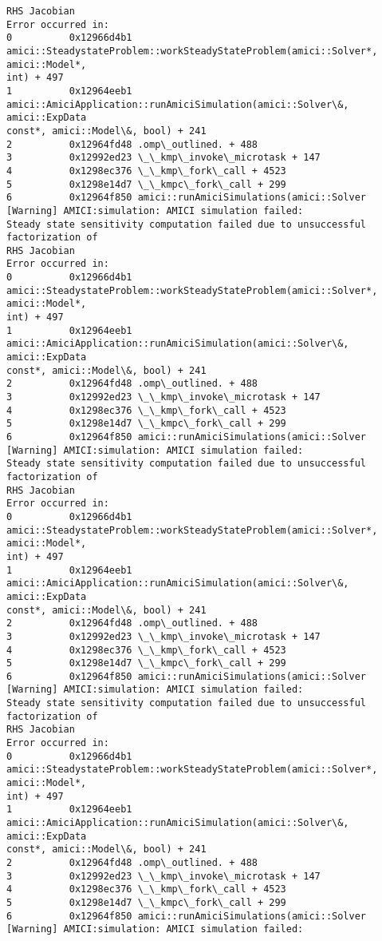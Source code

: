 \documentclass[11pt]{article}
\begin{document}
\begin{Verbatim}[commandchars=\\\{\}]
RHS Jacobian
Error occurred in:
0          0x12966d4b1
amici::SteadystateProblem::workSteadyStateProblem(amici::Solver*, amici::Model*,
int) + 497
1          0x12964eeb1
amici::AmiciApplication::runAmiciSimulation(amici::Solver\&, amici::ExpData
const*, amici::Model\&, bool) + 241
2          0x12964fd48 .omp\_outlined. + 488
3          0x12992ed23 \_\_kmp\_invoke\_microtask + 147
4          0x1298ec376 \_\_kmp\_fork\_call + 4523
5          0x1298e14d7 \_\_kmpc\_fork\_call + 299
6          0x12964f850 amici::runAmiciSimulations(amici::Solver
[Warning] AMICI:simulation: AMICI simulation failed:
Steady state sensitivity computation failed due to unsuccessful factorization of
RHS Jacobian
Error occurred in:
0          0x12966d4b1
amici::SteadystateProblem::workSteadyStateProblem(amici::Solver*, amici::Model*,
int) + 497
1          0x12964eeb1
amici::AmiciApplication::runAmiciSimulation(amici::Solver\&, amici::ExpData
const*, amici::Model\&, bool) + 241
2          0x12964fd48 .omp\_outlined. + 488
3          0x12992ed23 \_\_kmp\_invoke\_microtask + 147
4          0x1298ec376 \_\_kmp\_fork\_call + 4523
5          0x1298e14d7 \_\_kmpc\_fork\_call + 299
6          0x12964f850 amici::runAmiciSimulations(amici::Solver
[Warning] AMICI:simulation: AMICI simulation failed:
Steady state sensitivity computation failed due to unsuccessful factorization of
RHS Jacobian
Error occurred in:
0          0x12966d4b1
amici::SteadystateProblem::workSteadyStateProblem(amici::Solver*, amici::Model*,
int) + 497
1          0x12964eeb1
amici::AmiciApplication::runAmiciSimulation(amici::Solver\&, amici::ExpData
const*, amici::Model\&, bool) + 241
2          0x12964fd48 .omp\_outlined. + 488
3          0x12992ed23 \_\_kmp\_invoke\_microtask + 147
4          0x1298ec376 \_\_kmp\_fork\_call + 4523
5          0x1298e14d7 \_\_kmpc\_fork\_call + 299
6          0x12964f850 amici::runAmiciSimulations(amici::Solver
[Warning] AMICI:simulation: AMICI simulation failed:
Steady state sensitivity computation failed due to unsuccessful factorization of
RHS Jacobian
Error occurred in:
0          0x12966d4b1
amici::SteadystateProblem::workSteadyStateProblem(amici::Solver*, amici::Model*,
int) + 497
1          0x12964eeb1
amici::AmiciApplication::runAmiciSimulation(amici::Solver\&, amici::ExpData
const*, amici::Model\&, bool) + 241
2          0x12964fd48 .omp\_outlined. + 488
3          0x12992ed23 \_\_kmp\_invoke\_microtask + 147
4          0x1298ec376 \_\_kmp\_fork\_call + 4523
5          0x1298e14d7 \_\_kmpc\_fork\_call + 299
6          0x12964f850 amici::runAmiciSimulations(amici::Solver
[Warning] AMICI:simulation: AMICI simulation failed:

\end{Verbatim}
\end{document}
